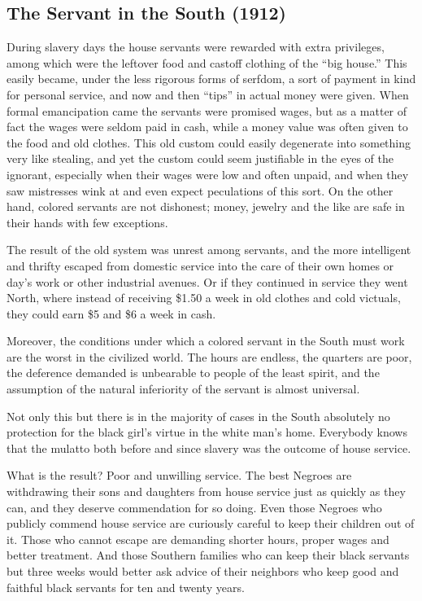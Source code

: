 \documentclass[letterpaper,10pt,english]{jupyterBook}
\begin{document}
\subsection{The Servant in the South (1912)}
\label{\detokenize{Volumes/03/06/servant_in_the_south:the-servant-in-the-south-1912}}\label{\detokenize{Volumes/03/06/servant_in_the_south::doc}}
\sphinxAtStartPar
During slavery days the house servants were rewarded with extra privileges, among which were the left\sphinxhyphen{}over food and cast\sphinxhyphen{}off clothing of the “big house.” This easily became, under the less rigorous forms of serfdom, a sort of payment in kind for personal service, and now and then “tips” in actual money were given. When formal emancipation came the servants were promised wages, but as a matter of fact the wages were seldom paid in cash, while a money value was often given to the food and old clothes. This old custom could easily degenerate into something very like stealing, and yet the custom could seem justifiable in the eyes of the ignorant, especially when their wages were low and often unpaid, and when they saw mistresses wink at and even expect peculations of this sort. On the other hand, colored servants are not dishonest; money, jewelry and the like are safe in their hands with few exceptions.

\sphinxAtStartPar
The result of the old system was unrest among servants, and the more intelligent and thrifty escaped from domestic service into the care of their own homes or day’s work or other industrial avenues. Or if they continued in service they went North, where instead of receiving \$1.50 a week in old clothes and cold victuals, they could earn \$5 and \$6 a week in cash.

\sphinxAtStartPar
Moreover, the conditions under which a colored servant in the South must work are the worst in the civilized world. The hours are endless, the quarters are poor, the deference demanded is unbearable to people of the least spirit, and the assumption of the natural inferiority of the servant is almost universal.

\sphinxAtStartPar
Not only this but there is in the majority of cases in the South absolutely no protection for the black girl’s virtue in the white man’s home. Everybody knows that the mulatto both before and since slavery was the outcome of house service.

\sphinxAtStartPar
What is the result? Poor and un­willing service. The best Negroes are withdrawing their sons and daughters from house service just as quickly as they can, and they deserve commendation for so doing. Even those Negroes who publicly commend house service are curiously careful to keep their children out of it. Those who cannot escape are demanding shorter hours, proper wages and better treatment. And those Southern families who can keep their black servants but three weeks would better ask advice of their neighbors who keep good and faithful black servants for ten and twenty years.
\end{document}
